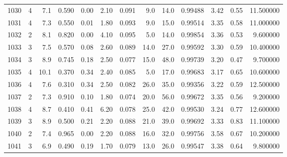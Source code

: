 \begin{tabular}{lrrrrrrrrrrrr}
1030 &        4 &            7.1 &             0.590 &         0.00 &            2.10 &      0.091 &                  9.0 &                  14.0 &  0.99488 &  3.42 &       0.55 &  11.500000 \\
1031 &        4 &            7.3 &             0.550 &         0.01 &            1.80 &      0.093 &                  9.0 &                  15.0 &  0.99514 &  3.35 &       0.58 &  11.000000 \\
1032 &        2 &            8.1 &             0.820 &         0.00 &            4.10 &      0.095 &                  5.0 &                  14.0 &  0.99854 &  3.36 &       0.53 &   9.600000 \\
1033 &        3 &            7.5 &             0.570 &         0.08 &            2.60 &      0.089 &                 14.0 &                  27.0 &  0.99592 &  3.30 &       0.59 &  10.400000 \\
1034 &        3 &            8.9 &             0.745 &         0.18 &            2.50 &      0.077 &                 15.0 &                  48.0 &  0.99739 &  3.20 &       0.47 &   9.700000 \\
1035 &        4 &           10.1 &             0.370 &         0.34 &            2.40 &      0.085 &                  5.0 &                  17.0 &  0.99683 &  3.17 &       0.65 &  10.600000 \\
1036 &        4 &            7.6 &             0.310 &         0.34 &            2.50 &      0.082 &                 26.0 &                  35.0 &  0.99356 &  3.22 &       0.59 &  12.500000 \\
1037 &        2 &            7.3 &             0.910 &         0.10 &            1.80 &      0.074 &                 20.0 &                  56.0 &  0.99672 &  3.35 &       0.56 &   9.200000 \\
1038 &        4 &            8.7 &             0.410 &         0.41 &            6.20 &      0.078 &                 25.0 &                  42.0 &  0.99530 &  3.24 &       0.77 &  12.600000 \\
1039 &        3 &            8.9 &             0.500 &         0.21 &            2.20 &      0.088 &                 21.0 &                  39.0 &  0.99692 &  3.33 &       0.83 &  11.100000 \\
1040 &        2 &            7.4 &             0.965 &         0.00 &            2.20 &      0.088 &                 16.0 &                  32.0 &  0.99756 &  3.58 &       0.67 &  10.200000 \\
1041 &        3 &            6.9 &             0.490 &         0.19 &            1.70 &      0.079 &                 13.0 &                  26.0 &  0.99547 &  3.38 &       0.64 &   9.800000 \\

\end{tabular}
